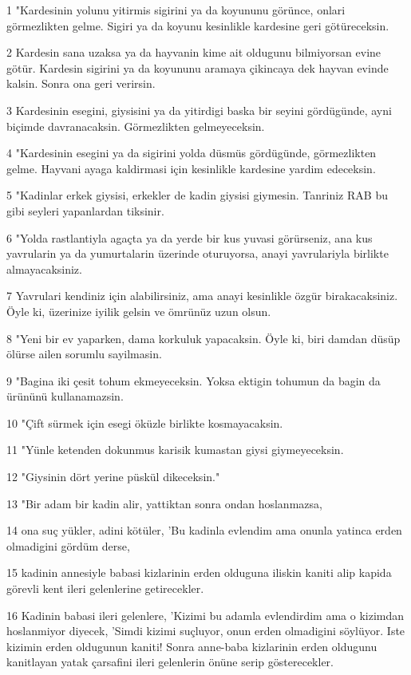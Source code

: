 \par 1 "Kardesinin yolunu yitirmis sigirini ya da koyununu görünce, onlari görmezlikten gelme. Sigiri ya da koyunu kesinlikle kardesine geri götüreceksin.
\par 2 Kardesin sana uzaksa ya da hayvanin kime ait oldugunu bilmiyorsan evine götür. Kardesin sigirini ya da koyununu aramaya çikincaya dek hayvan evinde kalsin. Sonra ona geri verirsin.
\par 3 Kardesinin esegini, giysisini ya da yitirdigi baska bir seyini gördügünde, ayni biçimde davranacaksin. Görmezlikten gelmeyeceksin.
\par 4 "Kardesinin esegini ya da sigirini yolda düsmüs gördügünde, görmezlikten gelme. Hayvani ayaga kaldirmasi için kesinlikle kardesine yardim edeceksin.
\par 5 "Kadinlar erkek giysisi, erkekler de kadin giysisi giymesin. Tanriniz RAB bu gibi seyleri yapanlardan tiksinir.
\par 6 "Yolda rastlantiyla agaçta ya da yerde bir kus yuvasi görürseniz, ana kus yavrularin ya da yumurtalarin üzerinde oturuyorsa, anayi yavrulariyla birlikte almayacaksiniz.
\par 7 Yavrulari kendiniz için alabilirsiniz, ama anayi kesinlikle özgür birakacaksiniz. Öyle ki, üzerinize iyilik gelsin ve ömrünüz uzun olsun.
\par 8 "Yeni bir ev yaparken, dama korkuluk yapacaksin. Öyle ki, biri damdan düsüp ölürse ailen sorumlu sayilmasin.
\par 9 "Bagina iki çesit tohum ekmeyeceksin. Yoksa ektigin tohumun da bagin da ürününü kullanamazsin.
\par 10 "Çift sürmek için esegi öküzle birlikte kosmayacaksin.
\par 11 "Yünle ketenden dokunmus karisik kumastan giysi giymeyeceksin.
\par 12 "Giysinin dört yerine püskül dikeceksin."
\par 13 "Bir adam bir kadin alir, yattiktan sonra ondan hoslanmazsa,
\par 14 ona suç yükler, adini kötüler, 'Bu kadinla evlendim ama onunla yatinca erden olmadigini gördüm derse,
\par 15 kadinin annesiyle babasi kizlarinin erden olduguna iliskin kaniti alip kapida görevli kent ileri gelenlerine getirecekler.
\par 16 Kadinin babasi ileri gelenlere, 'Kizimi bu adamla evlendirdim ama o kizimdan hoslanmiyor diyecek, 'Simdi kizimi suçluyor, onun erden olmadigini söylüyor. Iste kizimin erden oldugunun kaniti! Sonra anne-baba kizlarinin erden oldugunu kanitlayan yatak çarsafini ileri gelenlerin önüne serip gösterecekler.
